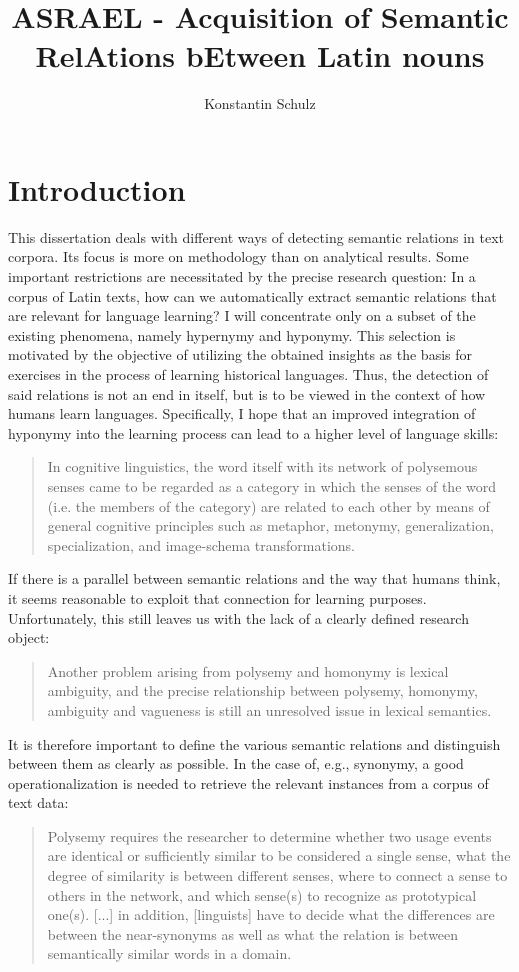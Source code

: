 \documentclass[jou]{apa6} %
\title{ASRAEL - Acquisition of Semantic RelAtions bEtween Latin nouns}
\author{Konstantin Schulz}
\affiliation{Humboldt-Universität zu Berlin}
\begin{document}
\maketitle    
\tableofcontents
\listoffigures
                        
\section{Introduction}

This dissertation deals with different ways of detecting semantic relations in text corpora. Its focus is more on methodology than on analytical results. Some important restrictions are necessitated by the precise research question: In a corpus of Latin texts, how can we automatically extract semantic relations that are relevant for language learning? I will concentrate only on a subset of the existing phenomena, namely hypernymy and hyponymy. This selection is motivated by the objective of utilizing the obtained insights as the basis for exercises in the process of learning historical languages. Thus, the detection of said relations is not an end in itself, but is to be viewed in the context of how humans learn languages. 
Specifically, I hope that an improved integration of hyponymy into the learning process can lead to a higher level of language skills: 
 \blockquote[{\cite[p.~5]{nerlichPolysemyFlexibilityIntroduction2003}}]{In cognitive linguistics, the word itself with its network of polysemous senses came to be regarded as a category in which the senses of the word (i.e. the members of the category) are related to each other by means of general cognitive principles such as metaphor, metonymy, generalization, specialization, and image-schema transformations.}
If there is a parallel between semantic relations and the way that humans think, it seems reasonable to exploit that connection for learning purposes. Unfortunately, this still leaves us with the lack of a clearly defined research object:
\blockquote[{\cite[p.~4]{nerlichPolysemyFlexibilityIntroduction2003}}]{Another problem arising from polysemy and homonymy is lexical ambiguity, and the precise relationship between polysemy, homonymy, ambiguity and vagueness is still an unresolved issue in lexical semantics.}
It is therefore important to define the various semantic relations and distinguish between them as clearly as possible. In the case of, e.g., synonymy, a good operationalization is needed to retrieve the relevant instances from a corpus of text data:
\blockquote[{\cite[p.~274]{divjakCorpusbasedCognitiveSemantics2009}}]{Polysemy requires the researcher to determine whether two usage events are identical or sufficiently similar to be considered a single sense, what the degree of similarity is between different senses, where to connect a sense to others in the network, and which sense(s) to recognize as prototypical one(s). [...] in addition, [linguists] have to decide what the differences are between the near-synonyms as well as what the relation is between semantically similar words in a domain.}
\end{document}
